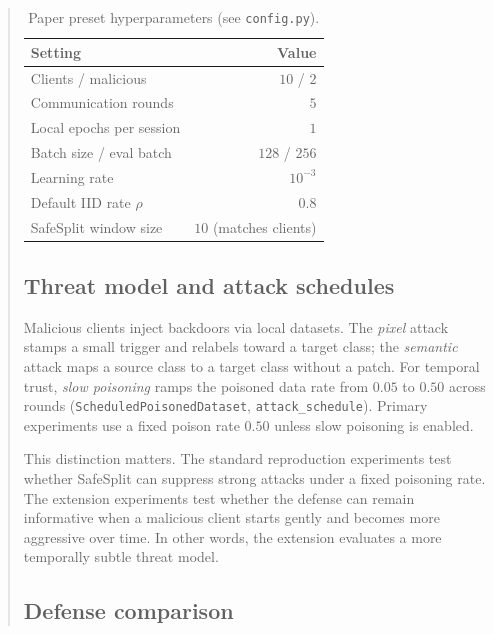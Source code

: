\documentclass{article}
\begin{document}
\begin{abstract}
\begin{table}[t]
  \caption{Paper preset hyperparameters (see \texttt{config.py}).}
  \label{tab:hyper}
  \begin{center}
    \begin{small}
      \begin{tabular}{lr}
        \toprule
        Setting & Value \\
        \midrule
        Clients / malicious & $10$ / $2$ \\
        Communication rounds & $5$ \\
        Local epochs per session & $1$ \\
        Batch size / eval batch & $128$ / $256$ \\
        Learning rate & $10^{-3}$ \\
        Default IID rate $\rho$ & $0.8$ \\
        SafeSplit window size & $10$ (matches clients) \\
        \bottomrule
      \end{tabular}
    \end{small}
  \end{center}
\end{table}

\subsection{Threat model and attack schedules}
\label{sec:threat}

Malicious clients inject backdoors via local datasets. The \emph{pixel} attack stamps a small trigger and relabels toward a target class; the \emph{semantic} attack maps a source class to a target class without a patch. For temporal trust, \emph{slow poisoning} ramps the poisoned data rate from $0.05$ to $0.50$ across rounds (\texttt{ScheduledPoisonedDataset}, \texttt{attack\_schedule}). Primary experiments use a fixed poison rate $0.50$ unless slow poisoning is enabled.

This distinction matters. The standard reproduction experiments test whether SafeSplit can suppress strong attacks under a fixed poisoning rate. The extension experiments test whether the defense can remain informative when a malicious client starts gently and becomes more aggressive over time. In other words, the extension evaluates a more temporally subtle threat model.

\subsection{Defense comparison}
\label{sec:table2}


\end{abstract}
\end{document}
